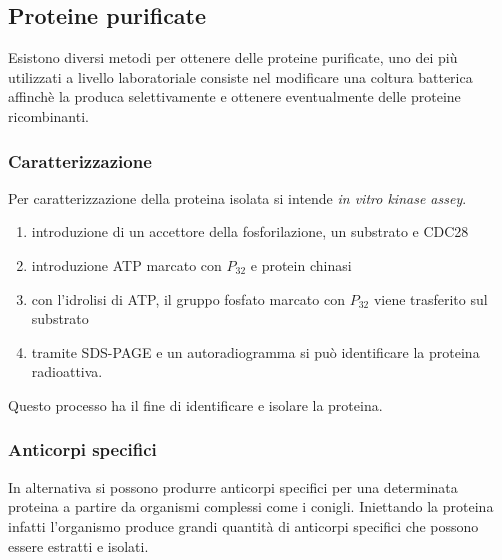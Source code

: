     \subsection{Proteine purificate}
        Esistono diversi metodi per ottenere delle proteine purificate, uno dei più utilizzati a livello laboratoriale consiste nel modificare una coltura batterica affinchè la produca selettivamente e ottenere eventualmente delle proteine ricombinanti.
        
        \subsubsection{Caratterizzazione}
        Per caratterizzazione della proteina isolata si intende \textit{in vitro kinase assey}.
        \begin{enumerate}
            \item introduzione di un accettore della fosforilazione, un substrato e CDC28
            \item introduzione ATP marcato con $P_{32}$ e protein chinasi
            \item con l'idrolisi di ATP, il gruppo fosfato marcato con $P_{32}$ viene trasferito sul substrato
            \item tramite SDS-PAGE e un autoradiogramma si può identificare la proteina radioattiva.
        \end{enumerate}
        Questo processo ha il fine di identificare e isolare la proteina.
        
        \subsubsection{Anticorpi specifici}
            In alternativa si possono produrre anticorpi specifici per una determinata proteina a partire da organismi complessi come i conigli. 
            Iniettando la proteina infatti l'organismo produce grandi quantità di anticorpi specifici che possono essere estratti e isolati.
            
